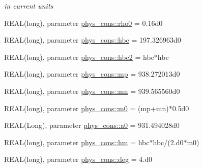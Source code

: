 \begin{DoxyCompactItemize}
\begin{DoxyCompactList}\small\item\em in current units \item\end{DoxyCompactList}\item 
REAL(long), parameter \hyperlink{namespacephys__cons_a4b10513970a98ad78b85723c60d9a8b6}{phys\_\-cons::rho0} = 0.16d0
\item 
REAL(long), parameter \hyperlink{namespacephys__cons_a3f47589553abc71257ab3e88ef7bbb39}{phys\_\-cons::hbc} = 197.326963d0
\item 
REAL(long), parameter \hyperlink{namespacephys__cons_af78d210174277076bb64ff4403f8c9fd}{phys\_\-cons::hbc2} = hbc$\ast$hbc
\item 
REAL(long), parameter \hyperlink{namespacephys__cons_ae2a4cb4e421fe399f19d0729b5617fed}{phys\_\-cons::mp} = 938.272013d0
\item 
REAL(long), parameter \hyperlink{namespacephys__cons_ad68aaba74b75e1e13f1367c1eb0904c1}{phys\_\-cons::mn} = 939.565560d0
\item 
REAL(long), parameter \hyperlink{namespacephys__cons_a2e392d52d36b5c1db0d17928aa40f35b}{phys\_\-cons::m0} = (mp+mn)$\ast$0.5d0
\item 
REAL(Long), parameter \hyperlink{namespacephys__cons_a02e8bb2c808e0085a317bf36ff79ae2a}{phys\_\-cons::a0} = 931.494028d0
\item 
REAL(long), parameter \hyperlink{namespacephys__cons_ad97ad749ef4f8f66c56a0facb7394cb5}{phys\_\-cons::hm} = hbc$\ast$hbc/(2.d0$\ast$m0)
\item 
REAL(long), parameter \hyperlink{namespacephys__cons_a553e3e17652770308e6bffcb8fcb5a95}{phys\_\-cons::deg} = 4.d0
\end{DoxyCompactItemize}
